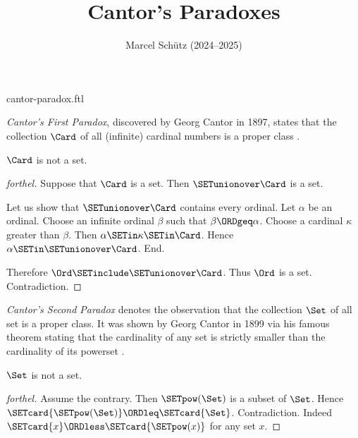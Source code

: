 \documentclass{article}
\title{Cantor's Paradoxes}
\author{Marcel Schütz (2024--2025)}
\date{}
\begin{document}
\begin{smodule}{cantor-paradox.ftl}
\maketitle


\noindent \emph{Cantor's First Paradox}, discovered by Georg Cantor in 1897,
states that the collection $\Card$ of all (infinite) cardinal numbers is a
proper class \cite[chapter 156]{Cantor1991}.

\begin{theorem}[forthel,title=Cantor's First Paradox,id=cantor_paradox_1]
  $\Card$ is not a set.
\end{theorem}
\begin{proof}[forthel]
  Suppose that $\Card$ is a set.
  Then $\SETunionover \Card$ is a set.

  Let us show that $\SETunionover \Card$ contains every ordinal.
    Let $\alpha$ be an ordinal.
    Choose an infinite ordinal $\beta$ such that $\beta \ORDgeq \alpha$.
    Choose a cardinal $\kappa$ greater than $\beta$.
    Then $\alpha \SETin \kappa \SETin \Card$.
    Hence $\alpha \SETin \SETunionover \Card$.
  End.

  Therefore $\Ord \SETinclude \SETunionover \Card$.
  Thus $\Ord$ is a set.
  Contradiction.
\end{proof}

\emph{Cantor's Second Paradox} denotes the observation that the collection
$\Set$ of all set is a proper class.
It was shown by Georg Cantor in 1899 via his famous theorem stating that the
cardinality of any set is strictly smaller than the cardinality of its 
powerset \cite[chapter 163]{Cantor1991}.

\begin{theorem}[forthel,title=Cantor's Second Paradox,id=cantor_paradox_2]
  $\Set$ is not a set.
\end{theorem}
\begin{proof}[forthel]
  Assume the contrary.
  Then $\SETpow(\Set)$ is a subset of $\Set$.
  Hence $\SETcard{\SETpow(\Set)} \ORDleq \SETcard{\Set}$.
  Contradiction.
  Indeed $\SETcard{x} \ORDless \SETcard{\SETpow(x)}$ for any set $x$.
\end{proof}

\printbibliography
{}
\end{smodule}
\end{document}
